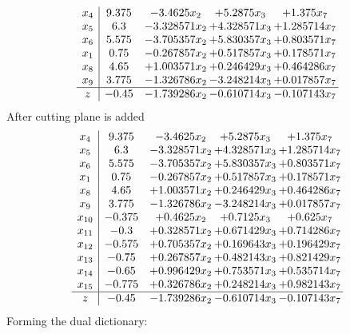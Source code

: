 \documentclass[11pt]{article}
\begin{document}
\[\begin{array}{c| c c@{\hskip 2pt} c@{\hskip 2pt} c@{\hskip 2pt} }
 x_{4}   &  9.375 & -3.4625 x_{2} & + 5.2875 x_{3} & + 1.375 x_{7}\\
 x_{5}   &  6.3 & -3.328571 x_{2} & + 4.328571 x_{3} & + 1.285714 x_{7}\\
 x_{6}   &  5.575 & -3.705357 x_{2} & + 5.830357 x_{3} & + 0.803571 x_{7}\\
 x_{1}   &  0.75 & -0.267857 x_{2} & + 0.517857 x_{3} & + 0.178571 x_{7}\\
 x_{8}   &  4.65 & + 1.003571 x_{2} & + 0.246429 x_{3} & + 0.464286 x_{7}\\
 x_{9}   &  3.775 & -1.326786 x_{2} & -3.248214 x_{3} & + 0.017857 x_{7}\\
\hline
z    &  -0.45 & -1.739286 x_{2} & -0.610714 x_{3} & -0.107143 x_{7}\\
\end{array}\]
 After cutting plane is added 
\[\begin{array}{c| c c@{\hskip 2pt} c@{\hskip 2pt} c@{\hskip 2pt} }
 x_{4}   &  9.375 & -3.4625 x_{2} & + 5.2875 x_{3} & + 1.375 x_{7}\\
 x_{5}   &  6.3 & -3.328571 x_{2} & + 4.328571 x_{3} & + 1.285714 x_{7}\\
 x_{6}   &  5.575 & -3.705357 x_{2} & + 5.830357 x_{3} & + 0.803571 x_{7}\\
 x_{1}   &  0.75 & -0.267857 x_{2} & + 0.517857 x_{3} & + 0.178571 x_{7}\\
 x_{8}   &  4.65 & + 1.003571 x_{2} & + 0.246429 x_{3} & + 0.464286 x_{7}\\
 x_{9}   &  3.775 & -1.326786 x_{2} & -3.248214 x_{3} & + 0.017857 x_{7}\\
 x_{10}   &  -0.375 & + 0.4625 x_{2} & + 0.7125 x_{3} & + 0.625 x_{7}\\
 x_{11}   &  -0.3 & + 0.328571 x_{2} & + 0.671429 x_{3} & + 0.714286 x_{7}\\
 x_{12}   &  -0.575 & + 0.705357 x_{2} & + 0.169643 x_{3} & + 0.196429 x_{7}\\
 x_{13}   &  -0.75 & + 0.267857 x_{2} & + 0.482143 x_{3} & + 0.821429 x_{7}\\
 x_{14}   &  -0.65 & + 0.996429 x_{2} & + 0.753571 x_{3} & + 0.535714 x_{7}\\
 x_{15}   &  -0.775 & + 0.326786 x_{2} & + 0.248214 x_{3} & + 0.982143 x_{7}\\
\hline
z    &  -0.45 & -1.739286 x_{2} & -0.610714 x_{3} & -0.107143 x_{7}\\
\end{array}\]
Forming the dual dictionary:
\end{document}
